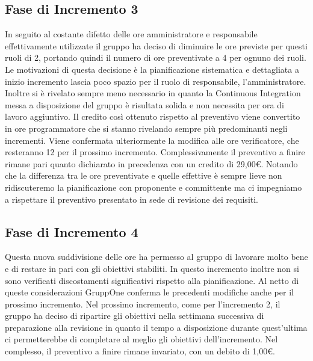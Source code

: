 \documentclass[../piano-di-progetto.tex]{subfiles}
\begin{document}
\subsection{Fase di Incremento 3}%
\label{sub:preventivo_a_finire/fase_di_incremento_3}

In seguito al costante difetto delle ore amministratore e responsabile effettivamente utilizzate il gruppo ha deciso di diminuire le ore previste per questi ruoli di 2, portando quindi il numero di ore preventivate a 4 per ognuno dei ruoli.
Le motivazioni di questa decisione è la pianificazione sistematica e dettagliata a inizio incremento lascia poco spazio per il ruolo di responsabile, l'amministratore.
Inoltre si è rivelato sempre meno necessario in quanto la Continuous Integration messa a disposizione del gruppo è risultata solida e non necessita per ora di lavoro aggiuntivo.
Il credito così ottenuto rispetto al preventivo viene convertito in ore programmatore che si stanno rivelando sempre più predominanti negli incrementi.
Viene confermata ulteriormente la modifica alle ore verificatore, che resteranno 12 per il prossimo incremento.
Complessivamente il preventivo a finire rimane pari quanto dichiarato in precedenza con un credito di 29,00€.
Notando che la differenza tra le ore preventivate e quelle effettive è sempre lieve non ridiscuteremo la pianificazione con proponente e committente ma ci impegniamo a rispettare il preventivo presentato in sede di revisione dei requisiti.



\subsection{Fase di Incremento 4}%
\label{sub:preventivo_a_finire/fase_di_incremento_4}

Questa nuova suddivisione delle ore ha permesso al gruppo di lavorare molto bene e di restare in pari con gli obiettivi stabiliti.
In questo incremento inoltre non si sono verificati discostamenti significativi rispetto alla pianificazione.
Al netto di queste considerazioni GruppOne conferma le precedenti modifiche anche per il prossimo incremento.
Nel prossimo incremento, come per l'incremento 2, il gruppo ha deciso di ripartire gli obiettivi nella settimana successiva di preparazione alla revisione in quanto il tempo a disposizione durante quest'ultima ci permetterebbe di completare al meglio gli obiettivi dell'incremento.
Nel complesso, il preventivo a finire rimane invariato, con un debito di 1,00€.


\end{document}
